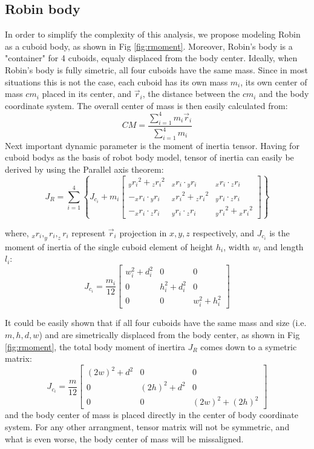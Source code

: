 \subsection{Robin body}
In order to simplify the complexity of this analysis, we propose modeling Robin as a cuboid body, as shown in Fig \ref{fig:rmoment}. Moreover, Robin's body is a "container" for 4 cuboids, equaly displaced from the body center. Ideally, when Robin's body is fully simetric, all four cuboids have the same mass. Since in most situations this is not the case, each cuboid has its own mass $m_i$, its own center of mass $cm_i$ placed in its center, and $\vec{r}_i$, the distance between the $cm_i$ and the body coordinate system. The overall center of mass is then easily calculated from: 
\begin{equation}
CM=\frac{\sum_{i=1}^{4}m_i\vec{r}_i}{\sum_{i=1}^{4}m_i}
\end{equation}
Next important dynamic parameter is the moment of inertia tensor. Having for cuboid bodys as the basis of robot body model, tensor of inertia can easily be derived by using the Parallel axis theorem:
\begin{equation}
J_R=\sum_{i=1}^{4}\left \{J_{c_i}+m_i\begin{bmatrix}
{_yr_i}^2+{_zr_i}^2 & {_xr_i}\cdot {_yr_i} & {_xr_i}\cdot {_zr_i} \\ 
-{_xr_i}\cdot {_yr_i} & {_xr_i}^2+{_zr_i}^2 & {_yr_i}\cdot {_zr_i}\\ 
-{_xr_i}\cdot {_zr_i} & {_yr_i}\cdot {_zr_i} & {_yr_i}^2+{_xr_i}^2
\end{bmatrix} \right \}
\end{equation}

where, $_xr_i, _yr_i, _zr_i$ represent $\vec{r}_i$ projection in $x,y,z$ respectively, and $J_{c_i}$ is the moment of inertia of the single cuboid element of height $h_i$, width $w_i$ and length $l_i$:
\begin{equation}
J_{c_i}=\frac{m_i}{12}\begin{bmatrix}
w_i^2+d_i^2 &0&0 \\ 
0 &h_i^2+d_i^2&0\\ 
0 &0& w_i^2+h_i^2
\end{bmatrix}
\end{equation} 

It could be easily shown that if all four cuboids have the same mass and size (i.e. $m,h,d,w$) and are simetrically displaced from the body center, as shown in Fig \ref{fig:rmoment}, the total body moment of inertira $J_R$ comes down to a symetric matrix:
\begin{equation}
J_{c_i}=\frac{m}{12}\begin{bmatrix}
(2w)^2+d^2 &0&0 \\ 
0 &(2h)^2+d^2&0\\ 
0 &0& (2w)^2+(2h)^2
\end{bmatrix}
\end{equation} 
and the body center of mass is placed directly in the center of body coordinate system. For any other arrangment, tensor matrix will not be symmetric, and what is even worse, the body center of mass will be missaligned.


